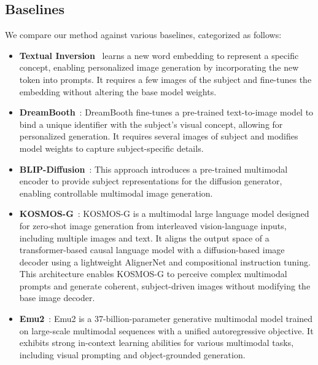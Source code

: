 \subsection{Baselines}
\label{sec:Baselines_Details}

We compare our method against various baselines, categorized as follows:

\begin{itemize}[left=2pt, itemsep=0.5pt,topsep=0.5pt]
\item \textbf{Textual Inversion}~\citep{gal2022imageworthwordpersonalizing} learns a new word embedding to represent a specific concept, enabling personalized image generation by incorporating the new token into prompts. It requires a few images of the subject and fine-tunes the embedding without altering the base model weights.
\item \textbf{DreamBooth}~\citep{ruiz2023dreamboothfinetuningtexttoimage}: DreamBooth fine-tunes a pre-trained text-to-image model to bind a unique identifier with the subject's visual concept, allowing for personalized generation. It requires several images of subject and modifies model weights to capture subject-specific details.

\item \textbf{BLIP-Diffusion}~\citep{li2023blipdiffusionpretrainedsubjectrepresentation}: This approach introduces a pre-trained multimodal encoder to provide subject representations for the diffusion generator, enabling controllable multimodal image generation. 

\item \textbf{KOSMOS-G}~\citep{Kosmos-G}: KOSMOS-G is a multimodal large language model designed for zero-shot image generation from interleaved vision-language inputs, including multiple images and text. It aligns the output space of a transformer-based causal language model with a diffusion-based image decoder using a lightweight AlignerNet and compositional instruction tuning. This architecture enables KOSMOS-G to perceive complex multimodal prompts and generate coherent, subject-driven images without modifying the base image decoder.

\item \textbf{Emu2}~\citep{emu2}: Emu2 is a 37-billion-parameter generative multimodal model trained on large-scale multimodal sequences with a unified autoregressive objective. It exhibits strong in-context learning abilities for various multimodal tasks, including visual prompting and object-grounded generation.


\end{itemize}
